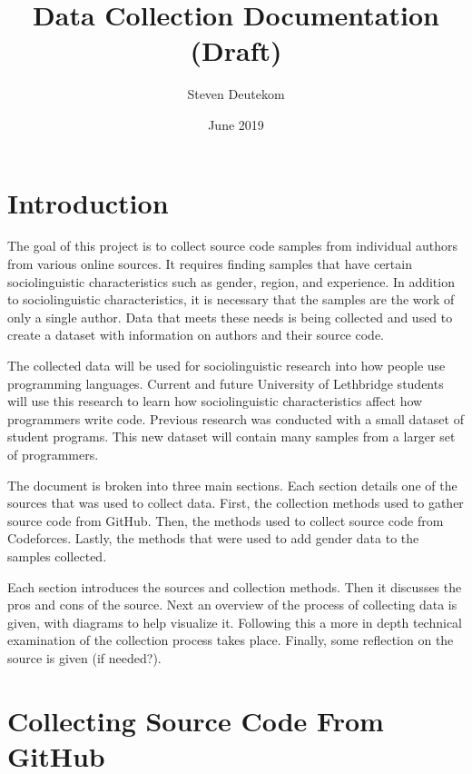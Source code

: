 \documentclass{article}
\begin{document}
\title{Data Collection Documentation (Draft)}
\author{Steven Deutekom}
\date{June 2019}
\maketitle


\newpage
\tableofcontents


\newpage
\section{Introduction}
The goal of this project is to collect source code samples from individual authors from various online sources. It requires finding samples that have certain sociolinguistic characteristics such as gender, region, and experience. In addition to sociolinguistic characteristics, it is necessary that the samples are the work of only a single author. Data that meets these needs is being collected and used to create a dataset with information on authors and their source code.

The collected data will be used for sociolinguistic research into how people use programming languages. Current and future University of Lethbridge students will use this research to learn how sociolinguistic characteristics affect how programmers write code. Previous research was conducted with a small dataset of student programs. This new dataset will contain many samples from a larger set of programmers.

The document is broken into three main sections. Each section details one of the sources that was used to collect data. First, the collection methods used to gather source code from GitHub. Then, the methods used to collect source code from Codeforces. Lastly, the methods that were used to add gender data to the samples collected.

Each section introduces the sources and collection methods. Then it discusses the pros and cons of the source. Next an overview of the process of collecting data is given, with diagrams to help visualize it. Following this a more in depth technical examination of the collection process takes place. Finally, some reflection on the source is given (if needed?).


\section{Collecting Source Code From GitHub}
\end{document}

